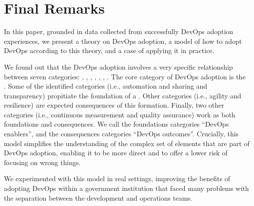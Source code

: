 \section{Final Remarks} \label{sec:conclusion}

In this paper, grounded in data collected from successfully DevOps adoption
experiences, we present a theory on DevOps adoption, a model of how to adopt
DevOps according to this theory, and a case of applying it in practice.

We found out that the DevOps adoption involves a very specific relationship between
seven categories: , , \cc, , , , .
The core category of DevOps adoption is the \cc. Some of the
identified categories (i.e., automation and sharing and transparency) propitiate
the foundation of a \cc. Other categories
(i.e., agility and resilience) are expected consequences of this formation.
Finally, two other categories (i.e., continuous measurement and quality
assurance) work as both foundations and consequences. We call the foundations
categories ``DevOps enablers'', and the consequences categories ``DevOps outcomes''.
Crucially, this model simplifies the understanding of the
complex set of elements that are part of DevOps adoption, enabling it to be
more direct and to offer a lower risk of focusing on wrong things.

We experimented with
this model in real settings, improving the benefits of adopting DevOps
within a government institution that faced many problems with the separation between the
development and operations teams.
